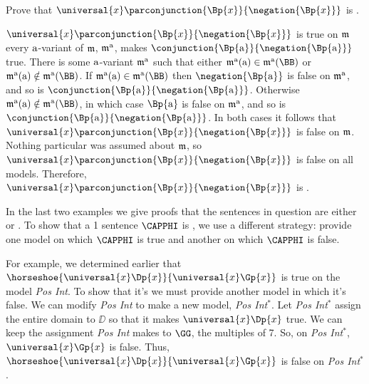 \begin{majorILnc}{}
	Prove that $\universal{\variable{x}}\parconjunction{\Bp{\variable{x}}}{\negation{\Bp{\variable{x}}}}$ is .
\end{majorILnc}
\begin{PROOF}
	$\universal{\variable{x}}\parconjunction{\Bp{\variable{x}}}{\negation{\Bp{\variable{x}}}}$ is true on $\mathfrak{m}$ \Iff every $\mathrm{a}$-variant of $\mathfrak{m}$, $\mathfrak{m^{\mathrm{\mathrm{a}}}_{\mathrm{}}}$, makes $\conjunction{\Bp{\constant{a}}}{\negation{\Bp{\constant{a}}}}$ true.
	There is some $\mathrm{a}$-variant $\mathfrak{m^{\mathrm{\mathrm{a}}}_{\mathrm{}}}$ such that either $\As{\constant{a}}{}(\constant{a})\in\As{\constant{a}}{}(\BB)$ or $\As{\constant{a}}{}(\constant{a})\notin\As{\constant{a}}{}(\BB)$.
	If $\As{\constant{a}}{}(\constant{a})\in\As{\constant{a}}{}(\BB)$ then $\negation{\Bp{\constant{a}}}$ is false on $\mathfrak{m^{\mathrm{\mathrm{a}}}_{\mathrm{}}}$, and so is $\conjunction{\Bp{\constant{a}}}{\negation{\Bp{\constant{a}}}}$.
	Otherwise $\As{\constant{a}}{}(\constant{a})\notin\As{\constant{a}}{}(\BB)$, in which case $\Bp{\constant{a}}$ is false on $\mathfrak{m^{\mathrm{\mathrm{a}}}_{\mathrm{}}}$, and so is $\conjunction{\Bp{\constant{a}}}{\negation{\Bp{\constant{a}}}}$.
	In both cases it follows that $\universal{\variable{x}}\parconjunction{\Bp{\variable{x}}}{\negation{\Bp{\variable{x}}}}$ is false on $\mathfrak{m}$.
	Nothing particular was assumed about $\mathfrak{m}$, so $\universal{\variable{x}}\parconjunction{\Bp{\variable{x}}}{\negation{\Bp{\variable{x}}}}$ is false on all models.
	Therefore, $\universal{\variable{x}}\parconjunction{\Bp{\variable{x}}}{\negation{\Bp{\variable{x}}}}$ is .
\end{PROOF}

\noindent{}In the last two examples we give proofs that the sentences in question are either  or .
To show that a \GQL{}1 sentence $\CAPPHI$ is , we use a different strategy: provide one model on which $\CAPPHI$ is true and another on which $\CAPPHI$ is false.

For example, we determined earlier that $\horseshoe{\universal{\variable{x}}\Dp{\variable{x}}}{\universal{\variable{x}}\Gp{\variable{x}}}$ is true on the model \emph{Pos Int}.
To show that it's  we must provide another model in which it's false.
We can modify \emph{Pos Int} to make a new model, \emph{Pos Int$^*$}.  Let \emph{Pos Int$^*$} assign the entire domain to $\DD$ so that it makes $\universal{\variable{x}}\Dp{\variable{x}}$ true.  We can keep the assignment \emph{Pos Int} makes to $\GG$, the multiples of 7.  So, on \emph{Pos Int$^*$}, $\universal{\variable{x}}\Gp{\variable{x}}$ is false.  Thus, $\horseshoe{\universal{\variable{x}}\Dp{\variable{x}}}{\universal{\variable{x}}\Gp{\variable{x}}}$ is false on \emph{Pos Int$^*$}.

